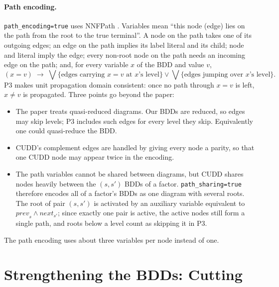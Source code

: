 \documentclass[manuscript, screen]{jair}
\newcommand{\opt}[1]{\texttt{#1}}
\newcommand{\prev}[1]{\mathit{prev}_{#1}}
\newcommand{\nxt}[1]{\mathit{next}_{#1}}
\begin{document}
\paragraph{Path encoding.} \opt{path\_encoding=true} uses NNFPath \parencite{abio-et-al-cpaior2016}.
Variables mean ``this node (edge) lies on the path from the root to the true terminal''. A node on the
path takes one of its outgoing edges; an edge on the path implies its label literal and its child;
node and literal imply the edge; every non-root node on the path needs an incoming edge on the path;
and, for every variable $x$ of the BDD and value $v$,
\[
  (x = v) \;\rightarrow\; \bigvee \{\text{edges carrying } x = v \text{ at } x\text{'s level}\} \vee
  \bigvee \{\text{edges jumping over } x\text{'s level}\}. \tag{P3}
\]
P3 makes unit propagation domain consistent: once no path through $x = v$ is left, $x \neq v$ is
propagated. Three points go beyond the paper:
\begin{itemize}
  \item The paper treats quasi-reduced diagrams. Our BDDs are reduced, so edges may skip levels; P3
        includes such edges for every level they skip. Equivalently one could quasi-reduce the BDD.
  \item CUDD's complement edges are handled by giving every node a parity, so that one CUDD node may
        appear twice in the encoding.
  \item The path variables cannot be shared between diagrams, but CUDD shares nodes heavily between
        the $(s,s')$ BDDs of a factor. \opt{path\_sharing=true} therefore encodes all of a factor's BDDs
        as one diagram with several roots. The root of pair $(s,s')$ is activated by an auxiliary
        variable equivalent to $\prev{s} \wedge \nxt{s'}$; since exactly one pair is active, the
        active nodes still form a single path, and roots below a level count as skipping it in P3.
\end{itemize}
The path encoding uses about three variables per node instead of one.

\section{Strengthening the BDDs: Cutting}\label{sec:cut}
\end{document}
